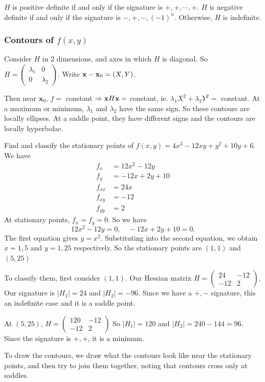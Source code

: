 \documentclass[a4paper]{article}
\begin{document}
    \begin{prop}
      $H$ is positive definite if and only if the signature is $+, +, \cdots, +$. $H$ is negative definite if and only if the signature is $-, +, \cdots, (-1)^n$. Otherwise, $H$ is indefinite.
    \end{prop}

    \subsubsection{Contours of \texorpdfstring{$f(x, y)$}{f(x, y)}}
    Consider $H$ in 2 dimensions, and axes in which $H$ is diagonal. So $H = 
    \begin{pmatrix}
      \lambda_1 & 0\\
      0 & \lambda_2
    \end{pmatrix}$. Write $\mathbf{x} - \mathbf{x}_0 = (X, Y)$.

    Then near $\mathbf{x}_0$, $f = $ constant $\Rightarrow \mathbf{x}H\mathbf{x} = $ constant, ie. $\lambda_1 X^2 + \lambda_2 Y^2 = $ constant. At a maximum or minimum, $\lambda_1$ and $\lambda_2$ have the same sign. So these contours are locally ellipses. At a saddle point, they have different signs and the contours are locally hyperbolae.

    \begin{eg}
      Find and classify the stationary points of $f(x, y) = 4x^3 - 12xy + y^2 + 10y + 6$. We have
      \begin{align*}
        f_x &= 12x^2 - 12y\\
        f_y &= -12x + 2y + 10\\
        f_{xx} &= 24x\\
        f_{xy} &= -12\\
        f_{yy} &= 2
      \end{align*}
      At stationary points, $f_x = f_y = 0$. So we have
      \[
        12x^2 - 12y = 0,\quad -12x + 2y + 10 = 0.
      \]
      The first equation gives $y = x^2$. Substituting into the second equation, we obtain $x = 1, 5$ and $y = 1, 25$ respectively. So the stationary points are $(1, 1)$ and $(5, 25)$

      To classify them, first consider $(1, 1)$. Our Hessian matrix $H = 
      \begin{pmatrix}
        24 & -12\\
        -12 & 2
      \end{pmatrix}$. Our signature is $|H_1| = 24$ and $|H_2| = -96$. Since we have a $+, -$ signature, this an indefinite case and it is a saddle point.

      At $(5, 25)$, $H = 
      \begin{pmatrix}
        120 & -12\\
        -12 & 2
      \end{pmatrix}$
      So $|H_1| = 120$ and $|H_2| = 240 - 144 = 96$. Since the signature is $+, +$, it is a minimum.

      To draw the contours, we draw what the contours look like near the stationary points, and then try to join them together, noting that contours cross only at saddles.
    \end{eg}
\end{document}
